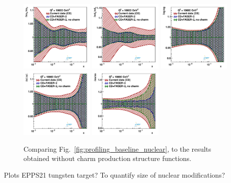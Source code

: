 \begin{figure}[t]
\centering
\includegraphics[width=0.32\textwidth]{plots/nuclear_fasernu2/inclusive-only_vs_inclusive+charm/statOnly_FASERv2_q2_10000_pdf_uv_ratio.pdf}
\includegraphics[width=0.32\textwidth]{plots/nuclear_fasernu2/inclusive-only_vs_inclusive+charm/statOnly_FASERv2_q2_10000_pdf_dv_ratio.pdf}
\includegraphics[width=0.32\textwidth]{plots/nuclear_fasernu2/inclusive-only_vs_inclusive+charm/statOnly_FASERv2_q2_10000_pdf_g_ratio.pdf}\\
\includegraphics[width=0.32\textwidth]{plots/nuclear_fasernu2/inclusive-only_vs_inclusive+charm/statOnly_FASERv2_q2_10000_pdf_Sea_ratio.pdf}
\includegraphics[width=0.32\textwidth]{plots/nuclear_fasernu2/inclusive-only_vs_inclusive+charm/statOnly_FASERv2_q2_10000_pdf_s_ratio.pdf}
\caption{Comparing Fig.~\ref{fig:profiling_baseline_nuclear}, 
to the results obtained without charm production structure functions.
}
\label{fig:profiling_charm_nuclear}
\end{figure}


Plots EPPS21 tungsten target? To quantify size of nuclear modifications?
